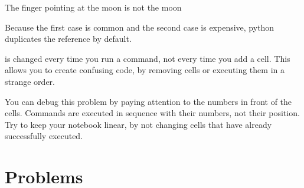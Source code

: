 \documentclass[justified, nobib]{tufte-handout}
\begin{document}
\smallskip
\begin{marginfigure}
    \vspace*{\fill}
    \centering
    \subfloat[Case 1]{\scalebox{1}{}}

    \vfill

    \subfloat[Case 2]{\scalebox{0.69}{}}
  \caption{The finger pointing at the moon is not the moon}
\label{fig:copy}
\end{marginfigure}

\noindent
Because the first case is common and the second case is expensive, python
duplicates the reference by default.
\begin{adjustwidth}{2.5em}{0pt}
\end{adjustwidth}


 is changed every time you run a command, not
every time you add a cell. This allows you to create confusing code, by removing
cells or executing them in a strange order.

\begin{adjustwidth}{2.5em}{0pt}
\end{adjustwidth}

\noindent
You can debug this problem by paying attention to the numbers in front of the
cells. Commands are executed in sequence with their numbers, not their
position. Try to keep your notebook linear, by not changing cells that have
already successfully executed.

\section*{Problems}
\vspace{-0.5cm}
\end{document}
